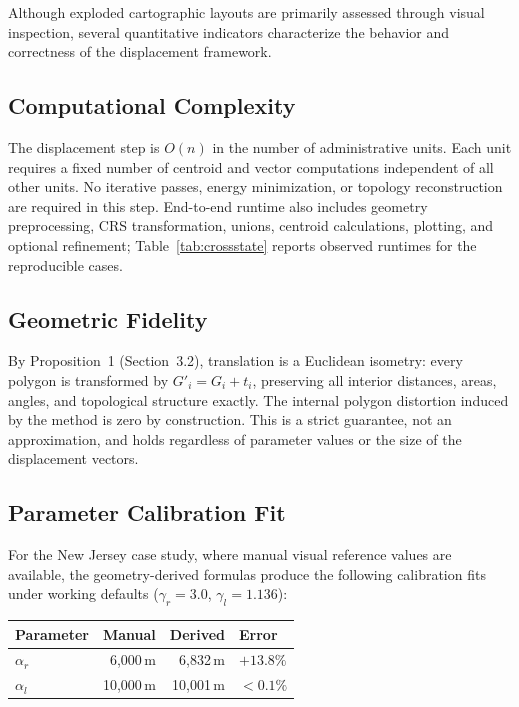 \documentclass[12pt, a4paper]{article}
\numberwithin{equation}{section}
\begin{document}
Although exploded cartographic layouts are primarily assessed through visual inspection, several quantitative indicators characterize the behavior and correctness of the displacement framework.

\subsection{Computational Complexity}

The displacement step is $O(n)$ in the number of administrative units. Each unit requires a fixed number of centroid and vector computations independent of all other units. No iterative passes, energy minimization, or topology reconstruction are required in this step. End-to-end runtime also includes geometry preprocessing, CRS transformation, unions, centroid calculations, plotting, and optional refinement; Table~\ref{tab:crossstate} reports observed runtimes for the reproducible cases.

\subsection{Geometric Fidelity}

By Proposition~1 (Section~3.2), translation is a Euclidean isometry: every polygon is transformed by $G'_i = G_i + t_i$, preserving all interior distances, areas, angles, and topological structure exactly. The internal polygon distortion induced by the method is zero by construction. This is a strict guarantee, not an approximation, and holds regardless of parameter values or the size of the displacement vectors.

\subsection{Parameter Calibration Fit}

For the New Jersey case study, where manual visual reference values are available, the geometry-derived formulas produce the following calibration fits under working defaults ($\gamma_r = 3.0$, $\gamma_l = 1.136$):

\begin{center}
\begin{tabular}{lrrl}
\toprule
\textbf{Parameter} & \textbf{Manual} & \textbf{Derived} & \textbf{Error} \\
\midrule
$\alpha_r$ & 6{,}000\,m  & 6{,}832\,m  & $+13.8\%$ \\
$\alpha_l$ & 10{,}000\,m & 10{,}001\,m & $<0.1\%$  \\
\bottomrule
\end{tabular}
\end{center}
\end{document}
